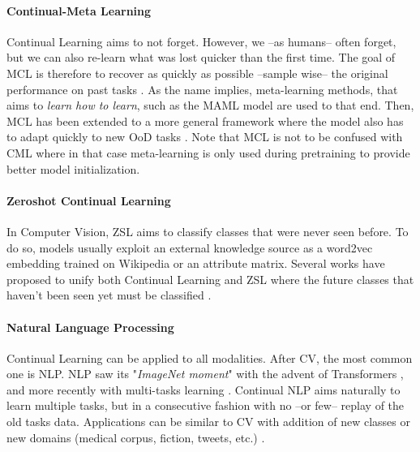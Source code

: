 \label{sec:related_meta}
\paragraph{Continual-Meta Learning} Continual Learning aims to not forget. However, we --as humans--
often forget, but we can also re-learn what was lost quicker than the first time. The goal of
\ac{MCL} is therefore to recover as quickly as possible --sample wise-- the original performance on
past tasks \citep{he2019metacontinual}. As the name implies, meta-learning methods, that aims to
\textit{learn how to learn}, such as the MAML model \citep{finn2017maml} are used to that end. Then,
\ac{MCL} has been extended to a more general framework where the model also has to adapt quickly to
new \acf{OoD} tasks \citep{caccia2020osaka}. Note that \acf{MCL} is not to be confused with
\acf{CML} where in that case meta-learning is only used during pretraining to provide better model
initialization.


\label{sec:related_zeroshot}
\paragraph{Zeroshot Continual Learning} In Computer Vision, \acf{ZSL}
\citep{lampert2009zeroshot,xian2019awa2} aims to classify classes that were never seen before. To do
so, models usually exploit an external knowledge source as a word2vec embedding
\citep{mikolov2013word2vec} trained on Wikipedia or an attribute matrix. Several works have proposed
to unify both Continual Learning and \ac{ZSL} where the future classes that haven't been seen yet
must be classified \citep{lopezpaz2017gem,wei2020lifelongzeroshot,gautam2020continualzeroshot}.


\label{sec:related_nlp}
\paragraph{Natural Language Processing} Continual Learning can be applied to all modalities. After
\acf{CV}, the most common one is \ac{NLP}. \ac{NLP} saw its "\textit{ImageNet moment}" with the
advent of Transformers \citep{vaswani2017transformer}, and more recently with multi-tasks learning
\citep{raffel2019t5}. Continual \ac{NLP} \citet{biesialska2020continualnlp} aims naturally to learn
multiple tasks, but in a consecutive fashion with no --or few-- replay of the old tasks data.
Applications can be similar to \ac{CV} with addition of new classes
\citep{masson2019episodiclifelongnlp} or new domains (\eg medical corpus, fiction, tweets, etc.)
\citep{gerald2021continualri}.


